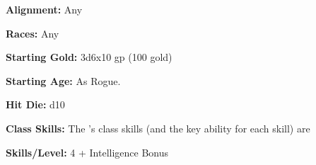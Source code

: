 


\textbf{Alignment:} Any

\textbf{Races:} Any

\textbf{Starting Gold:} 3d6x10 gp (100 gold)

\textbf{Starting Age:} As Rogue.

\textbf{Hit Die:} d10

\textbf{Class Skills:} The \currentclassname{}'s class skills (and the key ability for each skill) are

\textbf{Skills/Level:} 4 + Intelligence Bonus

\goodbab{}
\goodfor{}
\goodref{}
\goodwil{}

\begin{classtable}
\levelone{}
\leveltwo{}
\levelthree{}
\levelfour{}
\levelfive{}
\levelsix{}
\levelseven{}
\leveleight{}
\levelnine{}
\levelten{}
\leveleleven{}
\leveltwelve{}
\levelthirteen{}
\levelfourteen{}
\levelfifteen{}
\levelsixteen{}
\levelseventeen{}
\leveleighteen{}
\levelnineteen{}
\leveltwenty{}
\end{classtable}

\classfeatures

